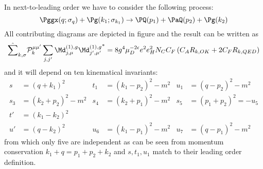 \label{sec:NLO.g}
In next-to-leading order we have to consider the following process:
\begin{equation}
\Pggx(q;\sigma_q) + \Pg(k_1;\sigma_{k_1}) \rightarrow \PQ(p_1)+\PaQ(p_2) + \Pg(k_2)
\end{equation}
All contributing diagrams are depicted in figure  and the result can be written as
\begin{equation}
\hat\sum_{k,\sigma}\mathcal P_{k}^{\mu\mu'}\sum_{j,j'}{\Md^{(1),g}_{j,\mu}\Md^{(1),g}_{j',\mu'}}^* = 8g^4\mu_D^{-2\epsilon}e^2e_H^2 N_C C_F\left( C_A R_{k,OK} + 2C_F R_{k,QED}\right)
\end{equation}
and it will depend on ten kinematical invariants:
\begin{align}
s &= (q+k_1)^2 &t_1 &=(k_1-p_2)^2-m^2 &u_1 &=(q-p_2)^2 -m^2\\
s_3 &= (k_2+p_2)^2-m^2 &s_4 &=(k_2+p_1)^2-m^2 &s_5 &= (p_1+p_2)^2=-u_5\\
t' &= (k_1-k_2)^2\\
u' &= (q-k_2)^2 &u_6 &=(k_1-p_1)^2-m^2 &u_7 &=(q-p_1)^2-m^2
\end{align}
from which only five are independent as can be seen from momentum conservation $k_1+q=p_1+p_2+k_2$ and $s,t_1,u_1$ match to their leading order definition.

